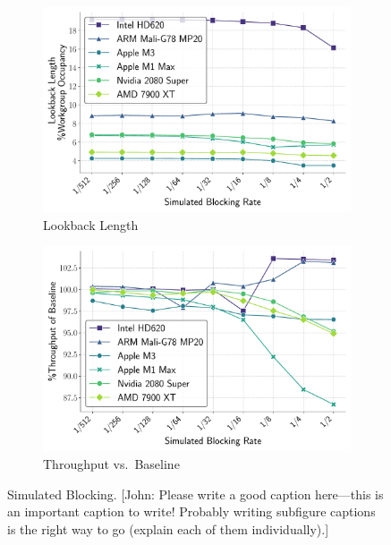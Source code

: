 \documentclass[sigconf]{acmart}
\newcommand{\john}[1]{{\footnotesize\color{cyan}[John: #1]}}
\begin{document}
\begin{figure}[t]
  \vspace{0.2em}

  \begin{subfigure}[t]{0.48\linewidth}
    \centering
    \includegraphics[width=\linewidth]{graphics/lookbackLength_plot.pdf}
    \caption{Lookback Length}
    \label{fig:lookback_length}
  \end{subfigure}\hfill
  \begin{subfigure}[t]{0.48\linewidth}
    \centering
    \includegraphics[width=\linewidth]{graphics/time_plot.pdf}
    \caption{Throughput vs.\ Baseline}
    \label{fig:execution_time}
  \end{subfigure}

  \caption{Simulated Blocking. \john{Please write a good caption here---this is an important caption to write! Probably writing subfigure captions is the right way to go (explain each of them individually).}}
  \label{fig:vertical_images}
\end{figure}
\end{document}
